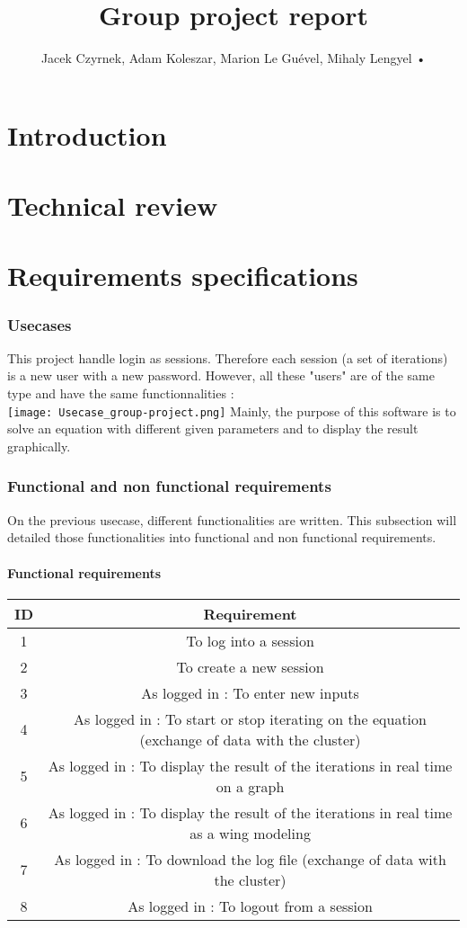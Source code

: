 \documentclass[10pt,a4paper]{report}
\author{Jacek Czyrnek, Adam Koleszar, Marion Le Guével, Mihaly Lengyel
•
}
\title{Group project report}
\begin{document}
\chapter{Introduction}


\chapter{Technical review}


\chapter{Requirements specifications}
	\subsection{Usecases}
This project handle login as sessions. Therefore each session (a set of iterations) is a new user with a new password.  However, all these "users" are of the same type and have the same functionnalities : \\
\texttt{[image: Usecase\_group-project.png]}
Mainly, the purpose of this software is to solve an equation with different given parameters and to display the result graphically.
	\subsection{Functional and non functional requirements}
On the previous usecase, different functionalities are written. This subsection will detailed those functionalities into functional and non functional requirements.
		\subsubsection{Functional requirements}
\begin{tabular}{|c|c|}
\hline 
\textbf{ID} & \textbf{Requirement} \\ 
\hline 
1 & To log into a session \\ 
\hline 
2 & To create a new session \\ 
\hline 
3 & As logged in : To enter new inputs \\ 
\hline
4 & As logged in : To start or stop iterating on the equation (exchange of data with the cluster) \\ 
\hline
5 & As logged in : To display the result of the iterations in real time on a graph \\ 
\hline
6 & As logged in : To display the result of the iterations in real time as a wing modeling \\ 
\hline
7 & As logged in : To download the log file (exchange of data with the cluster)\\ 
\hline
8 & As logged in : To logout from a session \\ 
\hline
\end{tabular} 
\end{document}
